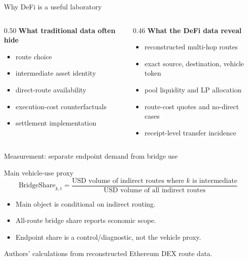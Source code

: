 \documentclass[aspectratio=169,11pt]{beamer}
\newcommand{\source}[1]{\vfill {\tiny\textcolor{DVCGrey}{#1}}}
\begin{document}
\begin{frame}{Why DeFi is a useful laboratory}
\begin{columns}[T,onlytextwidth]
\begin{column}{0.50\textwidth}
\textbf{What traditional data often hide}
\begin{itemize}
  \item route choice
  \item intermediate asset identity
  \item direct-route availability
  \item execution-cost counterfactuals
  \item settlement implementation
\end{itemize}
\end{column}
\begin{column}{0.46\textwidth}
\textbf{What the DeFi data reveal}
\begin{itemize}
  \item reconstructed multi-hop routes
  \item exact source, destination, vehicle token
  \item pool liquidity and LP allocation
  \item route-cost quotes and no-direct cases
  \item receipt-level transfer incidence
\end{itemize}
\end{column}
\end{columns}
\end{frame}

\begin{frame}{Measurement: separate endpoint demand from bridge use}
\begin{block}{Main vehicle-use proxy}
\[
\text{BridgeShare}_{k,t}
= \frac{\text{USD volume of indirect routes where }k\text{ is intermediate}}
{\text{USD volume of all indirect routes}}
\]
\end{block}
\begin{itemize}
  \item Main object is conditional on indirect routing.
  \item All-route bridge share reports economic scope.
  \item Endpoint share is a control/diagnostic, not the vehicle proxy.
\end{itemize}
\source{Authors' calculations from reconstructed Ethereum DEX route data.}
\end{frame}
\end{document}
